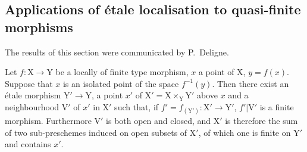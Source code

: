 \subsection{Applications of \'etale localisation to quasi-finite morphisms}
\label{subsection:IV.18.12}

The results of this section were communicated by P.~Deligne.

\begin{theorem}[18.12.1]
\label{IV.18.12.1}
Let $f:\mathrm{X}\to\mathrm{Y}$ be a locally of finite type morphism, $x$ a point of $\mathrm{X}$, $y=f(x)$.
Suppose that $x$ is an isolated point of the space $f^{-1}(y)$.
Then there exist an \'etale morphism $\mathrm{Y}'\to\mathrm{Y}$, a point $x'$ of $\mathrm{X}'=\mathrm{X}\times_{\mathrm{Y}}\mathrm{Y}'$ above $x$ and a neighbourhood $\mathrm{V}'$ of $x'$ in $\mathrm{X}'$ such that, if $f'=f_{(\mathrm{Y}')}:\mathrm{X}'\to\mathrm{Y}'$, $f'|\mathrm{V}'$ is a finite morphism.
Furthermore $\mathrm{V}'$ is both open and closed, and $\mathrm{X}'$ is therefore the sum of two sub-preschemes induced on open subsets of $\mathrm{X}'$, of which one is finite on $\mathrm{Y}'$ and contains $x'$.
\end{theorem}

